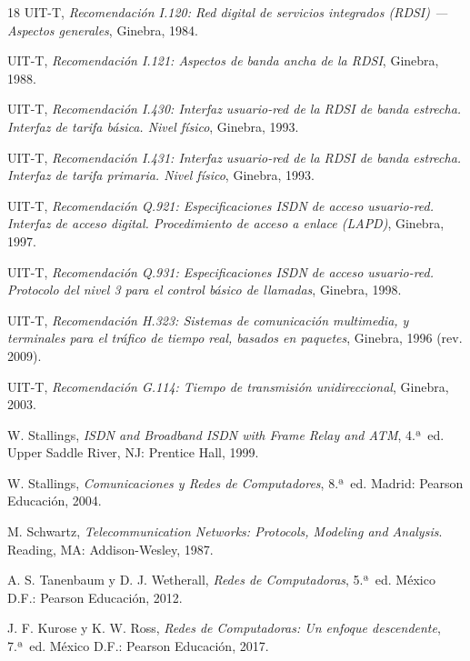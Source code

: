 \documentclass[12pt,a4paper]{article}
\begin{document}
\begin{thebibliography}{18}
    UIT-T, \textit{Recomendación I.120: Red digital de servicios integrados (RDSI) --- Aspectos generales}, Ginebra, 1984.

    UIT-T, \textit{Recomendación I.121: Aspectos de banda ancha de la RDSI}, Ginebra, 1988.

    UIT-T, \textit{Recomendación I.430: Interfaz usuario-red de la RDSI de banda estrecha. Interfaz de tarifa básica. Nivel físico}, Ginebra, 1993.

    UIT-T, \textit{Recomendación I.431: Interfaz usuario-red de la RDSI de banda estrecha. Interfaz de tarifa primaria. Nivel físico}, Ginebra, 1993.

    UIT-T, \textit{Recomendación Q.921: Especificaciones ISDN de acceso usuario-red. Interfaz de acceso digital. Procedimiento de acceso a enlace (LAPD)}, Ginebra, 1997.

    UIT-T, \textit{Recomendación Q.931: Especificaciones ISDN de acceso usuario-red. Protocolo del nivel 3 para el control básico de llamadas}, Ginebra, 1998.

    UIT-T, \textit{Recomendación H.323: Sistemas de comunicación multimedia, y terminales para el tráfico de tiempo real, basados en paquetes}, Ginebra, 1996 (rev. 2009).

    UIT-T, \textit{Recomendación G.114: Tiempo de transmisión unidireccional}, Ginebra, 2003.

    W. Stallings, \textit{ISDN and Broadband ISDN with Frame Relay and ATM}, 4.ª~ed. Upper Saddle River, NJ: Prentice Hall, 1999.

    W. Stallings, \textit{Comunicaciones y Redes de Computadores}, 8.ª~ed. Madrid: Pearson Educación, 2004.

    M. Schwartz, \textit{Telecommunication Networks: Protocols, Modeling and Analysis}. Reading, MA: Addison-Wesley, 1987.

    A. S. Tanenbaum y D. J. Wetherall, \textit{Redes de Computadoras}, 5.ª~ed. México D.F.: Pearson Educación, 2012.

    J. F. Kurose y K. W. Ross, \textit{Redes de Computadoras: Un enfoque descendente}, 7.ª~ed. México D.F.: Pearson Educación, 2017.


\end{thebibliography}
\end{document}
